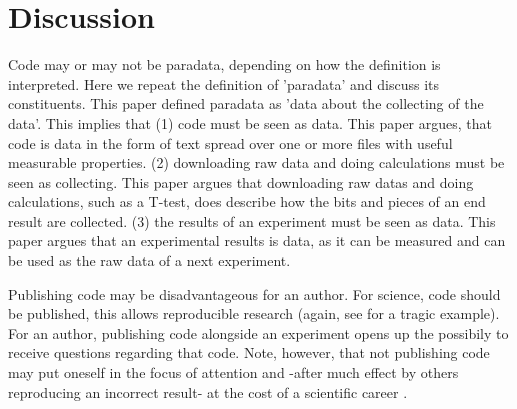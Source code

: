 \section{Discussion}


Code may or may not be paradata, depending on how the definition
is interpreted.
Here we repeat the definition of 'paradata' and discuss 
its constituents.
This paper defined paradata as 'data about the collecting of the data'.
This implies that (1) code must be seen as data.
This paper argues, that code is data in the form of text spread
over one or more files with useful measurable properties.
(2) downloading raw data and doing calculations must be seen as collecting.
This paper argues that downloading raw datas and doing calculations, 
such as a T-test,
does describe how the bits and pieces of an end result are collected.
(3) the results of an experiment must be seen as data.
This paper argues that an experimental results is data, 
as it can be measured and can be used as the raw data of a next experiment.


Publishing code may be disadvantageous for an author.
For science, code should be published, 
this allows reproducible research 
(again, see \cite{haibe2020importance} for a tragic example).
For an author, publishing code alongside an experiment opens up
the possibily to receive questions regarding that code.
Note, however, that not publishing code may put 
oneself in the focus of attention
and -after much effect by others reproducing an incorrect result-
at the cost of a scientific career \cite{baggerly2009deriving}.


